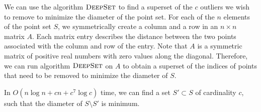 \documentclass[lotsofwhite]{patmorin}
\begin{document}
We can use the algorithm $\textsc{DeepSet}$ to find a superset of the $c$ outliers we wish to remove to minimize the diameter of the point set. For each of the $n$ elements of the point set $S$, we symmetrically create a column and a row in an $n\times n$ matrix $A$. Each matrix entry describes the distance between the two points associated with the column and row of the entry. Note that $A$ is a symmetric matrix of positive real numbers with zero values along the diagonal. Therefore, we can run algorithm $\textsc{DeepSet}$ on $A$ to obtain a superset of the indices of points that need to be removed to minimize the diameter of $S$.

\begin{thm}
In $O(n\log n + cn + c^7 \log c)$ time, we can find a set $S' \subset S$ of cardinality $c$, such that the diameter of $S\setminus S'$ is minimum.
\end{thm}
\end{document}
